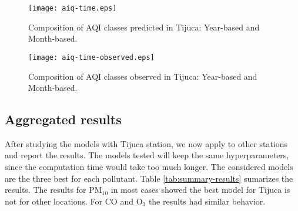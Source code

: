 \begin{figure}
    \centering
    \texttt{[image: aiq-time.eps]}
    \caption{Composition of AQI classes predicted in Tijuca: Year-based and Month-based.}
    \label{fig:aqitime}
\end{figure}

\begin{figure}
    \centering
    \texttt{[image: aiq-time-observed.eps]}
    \caption{Composition of AQI classes observed in Tijuca: Year-based and Month-based.}
    \label{fig:aqitime-observed}
\end{figure}

\subsection{Aggregated results}

After studying the models with Tijuca station, we now apply to other stations
and report the results. The models tested will keep the same hyperparameters,
since the computation time would take too much longer. The considered models
are the three best for each pollutant. Table \ref{tab:summary-results}
sumarizes the results. The results for PM$_{10}$ in most cases showed the
best model for Tijuca is not for other locations. For CO and O$_3$ the results
had similar behavior. 

